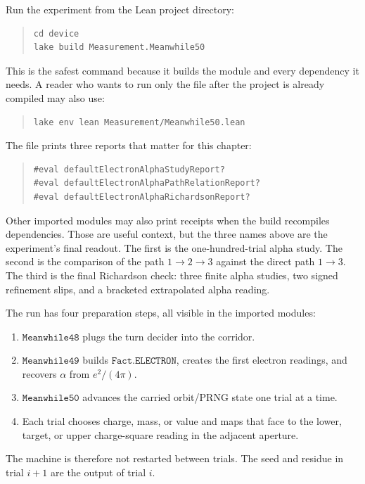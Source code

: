 Run the experiment from the Lean project directory:
\begin{quote}\small
\begin{verbatim}
cd device
lake build Measurement.Meanwhile50
\end{verbatim}
\end{quote}
This is the safest command because it builds the module and every dependency it needs. A reader who wants to run
only the file after the project is already compiled may also use:
\begin{quote}\small
\begin{verbatim}
lake env lean Measurement/Meanwhile50.lean
\end{verbatim}
\end{quote}
The file prints three reports that matter for this chapter:
\begin{quote}\small
\begin{verbatim}
#eval defaultElectronAlphaStudyReport?
#eval defaultElectronAlphaPathRelationReport?
#eval defaultElectronAlphaRichardsonReport?
\end{verbatim}
\end{quote}
Other imported modules may also print receipts when the build recompiles dependencies. Those are useful context,
but the three names above are the experiment's final readout. The first is the one-hundred-trial alpha study. The
second is the comparison of the path \(1\to2\to3\) against the direct path \(1\to3\). The third is the final
Richardson check: three finite alpha studies, two signed refinement slips, and a bracketed extrapolated alpha
reading.

The run has four preparation steps, all visible in the imported modules:
\begin{enumerate}
\item \(\texttt{Meanwhile48}\) plugs the turn decider into the corridor.
\item \(\texttt{Meanwhile49}\) builds \(\texttt{Fact.ELECTRON}\), creates the first electron readings, and
recovers \(\alpha\) from \(e^2/(4\pi)\).
\item \(\texttt{Meanwhile50}\) advances the carried orbit/PRNG state one trial at a time.
\item Each trial chooses charge, mass, or value and maps that face to the lower, target, or upper charge-square
reading in the adjacent aperture.
\end{enumerate}
The machine is therefore not restarted between trials. The seed and residue in trial \(i+1\) are the output of
trial \(i\).

